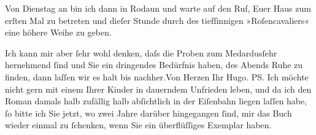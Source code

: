 \pstart
           Von Dienstag an bin ich dann in Rodaun und warte auf den Ruf, Euer Haus zum erſten Mal zu betreten und
               dieſer Stunde durch \label{K_L01973-1v}\label{K_L01973-1} des tiefſinnigen »Roſencavaliers« {\pb}eine höhere Weihe zu geben.\pend
           
\pstart
           Ich kann mir aber ſehr wohl denken, daſs die Proben zum Medardusſehr hernehmend ſind und Sie ein dringendes
               Bedürfnis haben, des Abends Ruhe zu finden, dann laſſen wir es halt bis
                  nachher.\hspace*{1.5em}Von Herzen Ihr\pend
           \pstart \spacefill\mbox{Hugo.}\pend{}
\pstart
           \noindent{}{\pb}\textsc{PS}. Ich möchte nicht gern mit einem Ihrer Kinder in
                  dauerndem Unfrieden leben, und da ich den Roman damals halb zufällig halb abſichtlich in der
                  Eiſenbahn liegen laſſen habe, ſo bitte ich Sie jetzt, wo zwei Jahre darüber
                  hingegangen ſind, mir das Buch wieder einmal zu ſchenken, wenn Sie ein
                  überflüſſiges Exemplar haben.\pend
           \endnumbering{}  
      